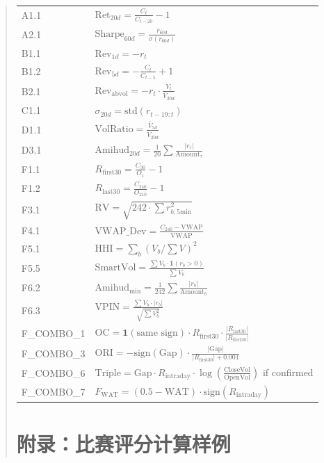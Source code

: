 \documentclass[12pt,a4paper]{article}
\begin{document}
\begin{abstract}
\begin{longtable}{ll}
A1.1 & $\text{Ret}_{20d} = \frac{C_t}{C_{t-20}} - 1$ \\
A2.1 & $\text{Sharpe}_{60d} = \frac{\bar{r}_{60d}}{\sigma(r_{60d})}$ \\
B1.1 & $\text{Rev}_{1d} = -r_t$ \\
B1.2 & $\text{Rev}_{5d} = -\frac{C_t}{C_{t-5}} + 1$ \\
B2.1 & $\text{Rev}_{\text{abvol}} = -r_t \cdot \frac{V_t}{\bar{V}_{20d}}$ \\
C1.1 & $\sigma_{20d} = \text{std}(r_{t-19:t})$ \\
D1.1 & $\text{VolRatio} = \frac{\bar{V}_{5d}}{\bar{V}_{20d}}$ \\
D3.1 & $\text{Amihud}_{20d} = \frac{1}{20}\sum \frac{|r_\tau|}{\text{Amount}_\tau}$ \\
F1.1 & $R_{\text{first30}} = \frac{C_{30}}{O_1} - 1$ \\
F1.2 & $R_{\text{last30}} = \frac{C_{240}}{O_{210}} - 1$ \\
F3.1 & $\text{RV} = \sqrt{242 \cdot \sum r_{b,\text{5min}}^2}$ \\
F4.1 & $\text{VWAP\_Dev} = \frac{C_{240} - \text{VWAP}}{\text{VWAP}}$ \\
F5.1 & $\text{HHI} = \sum_{b} (V_b/\sum V)^2$ \\
F5.5 & $\text{SmartVol} = \frac{\sum V_b \cdot \mathbf{1}(r_b > 0)}{\sum V_b}$ \\
F6.2 & $\text{Amihud}_{\text{min}} = \frac{1}{242}\sum \frac{|r_b|}{\text{Amount}_b}$ \\
F6.3 & $\text{VPIN} = \frac{\sum V_b \cdot |r_b|}{\sqrt{\sum V_b^2}}$ \\
F\_COMBO\_1 & $\text{OC} = \mathbf{1}(\text{same sign}) \cdot R_{\text{first30}} \cdot \frac{|R_{\text{last30}}|}{|R_{\text{first30}}|}$ \\
F\_COMBO\_3 & $\text{ORI} = -\text{sign}(\text{Gap}) \cdot \frac{|\text{Gap}|}{|R_{\text{first30}}| + 0.001}$ \\
F\_COMBO\_6 & $\text{Triple} = \text{Gap} \cdot R_{\text{intraday}} \cdot \log(\frac{\text{CloseVol}}{\text{OpenVol}})$ if confirmed \\
F\_COMBO\_7 & $F_{\text{WAT}} = (0.5 - \text{WAT}) \cdot \text{sign}(R_{\text{intraday}})$ \\
\end{longtable}

\section{附录：比赛评分计算样例}


\end{abstract}
\end{document}
